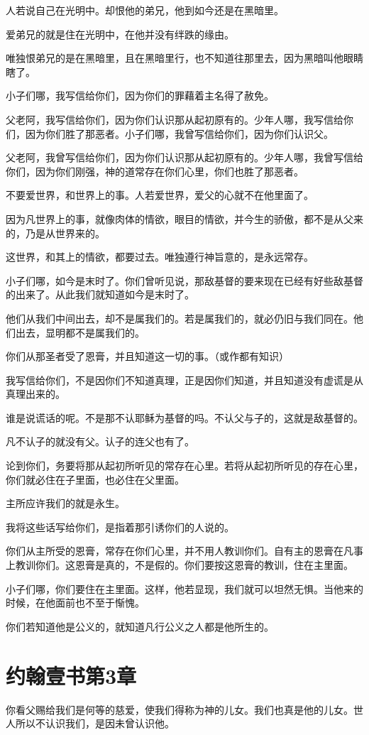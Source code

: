 \documentclass[12pt,oneside]{book}
\begin{document}
人若说自己在光明中。却恨他的弟兄，他到如今还是在黑暗里。

爱弟兄的就是住在光明中，在他并没有绊跌的缘由。

唯独恨弟兄的是在黑暗里，且在黑暗里行，也不知道往那里去，因为黑暗叫他眼睛瞎了。

小子们哪，我写信给你们，因为你们的罪藉着主名得了赦免。

父老阿，我写信给你们，因为你们认识那从起初原有的。少年人哪，我写信给你们，因为你们胜了那恶者。小子们哪，我曾写信给你们，因为你们认识父。

父老阿，我曾写信给你们，因为你们认识那从起初原有的。少年人哪，我曾写信给你们，因为你们刚强，神的道常存在你们心里，你们也胜了那恶者。

不要爱世界，和世界上的事。人若爱世界，爱父的心就不在他里面了。

因为凡世界上的事，就像肉体的情欲，眼目的情欲，并今生的骄傲，都不是从父来的，乃是从世界来的。

这世界，和其上的情欲，都要过去。唯独遵行神旨意的，是永远常存。

小子们哪，如今是末时了。你们曾听见说，那敌基督的要来现在已经有好些敌基督的出来了。从此我们就知道如今是末时了。

他们从我们中间出去，却不是属我们的。若是属我们的，就必仍旧与我们同在。他们出去，显明都不是属我们的。

你们从那圣者受了恩膏，并且知道这一切的事。（或作都有知识）

我写信给你们，不是因你们不知道真理，正是因你们知道，并且知道没有虚谎是从真理出来的。

谁是说谎话的呢。不是那不认耶稣为基督的吗。不认父与子的，这就是敌基督的。

凡不认子的就没有父。认子的连父也有了。

论到你们，务要将那从起初所听见的常存在心里。若将从起初所听见的存在心里，你们就必住在子里面，也必住在父里面。

主所应许我们的就是永生。

我将这些话写给你们，是指着那引诱你们的人说的。

你们从主所受的恩膏，常存在你们心里，并不用人教训你们。自有主的恩膏在凡事上教训你们。这恩膏是真的，不是假的。你们要按这恩膏的教训，住在主里面。

小子们哪，你们要住在主里面。这样，他若显现，我们就可以坦然无惧。当他来的时候，在他面前也不至于惭愧。

你们若知道他是公义的，就知道凡行公义之人都是他所生的。

\chapter{约翰壹书第3章}
你看父赐给我们是何等的慈爱，使我们得称为神的儿女。我们也真是他的儿女。世人所以不认识我们，是因未曾认识他。
\end{document}
